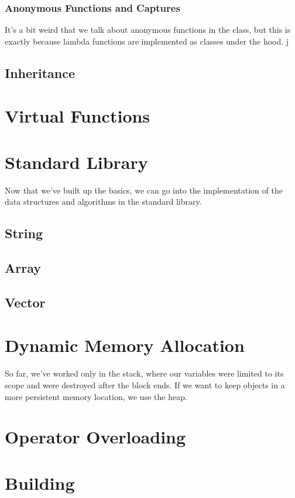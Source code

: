 \documentclass{article}
\newcounter{definition}[section]
\newcounter{algo}[section]
\begin{document}
    \subsubsection{Anonymous Functions and Captures} 

      It's a bit weird that we talk about anonymous functions in the class, but this is exactly because lambda functions are implemented as classes under the hood. j

      \begin{definition}
        \label{def:anonymous-functions}
        
      \end{definition} 

  \subsection{Inheritance}

\section{Virtual Functions} 

  

\section{Standard Library} 

    Now that we've built up the basics, we can go into the implementation of the data structures and algorithms in the standard library. 

  \subsection{String}

  \subsection{Array}

  \subsection{Vector}

\section{Dynamic Memory Allocation} 

  So far, we've worked only in the stack, where our variables were limited to its scope and were destroyed after the block ends. If we want to keep objects in a more persistent memory location, we use the heap.  

\section{Operator Overloading} 

\section{Building}
\end{document}

